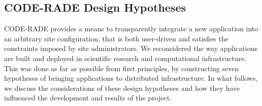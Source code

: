 \documentclass[a4paper]{jpconf}
\begin{document}
	\subsection{CODE-RADE Design Hypotheses}
    CODE-RADE provides a means to transparently integrate a new application into an arbitrary site
    configuration, that is both user-driven and satisfies the constraints imposed by site
    administrators. We reconsidered the way applications are built and deployed in scientific
    research and computational infrastructure.
    This was done as far as possible from first principles, by constructing seven hypotheses of
    bringing applications to distributed infrastructure. In what follows, we discuss the
    considerations  of these design hypotheses and how they have influenced the development and
    results of the project.
\end{document}
